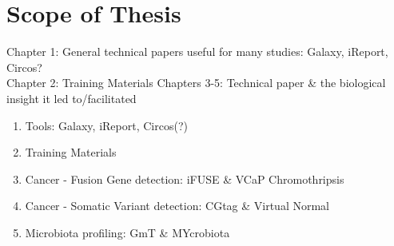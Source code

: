 \chapter*{Scope of Thesis}

Chapter 1: General technical papers useful for many studies: Galaxy, iReport, Circos? \\
Chapter 2: Training Materials
Chapters 3-5: Technical paper \& the biological insight it led to/facilitated \\

\begin{enumerate}
    \item Tools: Galaxy, iReport, Circos(?)
    \item Training Materials
    \item Cancer - Fusion Gene detection: iFUSE \& VCaP Chromothripsis
    \item Cancer - Somatic Variant detection: CGtag \& Virtual Normal
    \item Microbiota profiling: GmT \& MYcrobiota
\end{enumerate}
